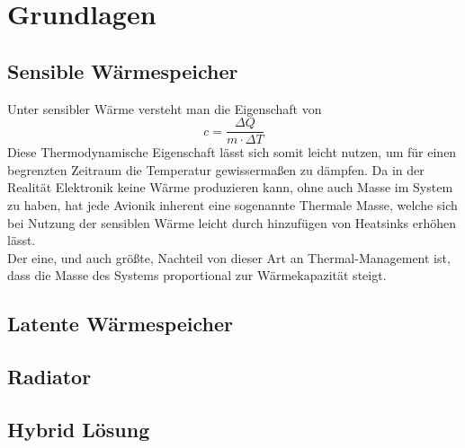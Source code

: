  \chapter{Grundlagen}
\label{chap:Grundlagen}			%


\section{Sensible Wärmespeicher}
\label{sec:sensiblewaermespeicher}
Unter sensibler Wärme versteht man die Eigenschaft von 
\begin{equation}
c = \frac{\Delta Q}{m \cdot \Delta T}
\end{equation}
Diese Thermodynamische Eigenschaft lässt sich somit leicht nutzen, um für einen begrenzten Zeitraum die Temperatur gewissermaßen zu dämpfen. Da in der Realität Elektronik keine Wärme produzieren kann, ohne auch Masse im System zu haben, hat jede Avionik inherent eine sogenannte Thermale Masse, welche sich bei Nutzung der sensiblen Wärme leicht durch hinzufügen von Heatsinks erhöhen lässt.\\
Der eine, und auch größte, Nachteil von dieser Art an Thermal-Management ist, dass die Masse des Systems proportional zur Wärmekapazität steigt.

\section{Latente Wärmespeicher}
\label{sec:latentewaermespeicher}

\section{Radiator}
\label{sec:radiator}

\section{Hybrid Lösung}
\label{sec:hybridloesung}

\newpage
